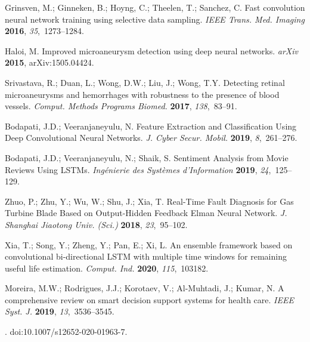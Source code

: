 \documentclass[electronics,article,accept ,moreauthors,pdftex]{mdpi}
\begin{document}
\begin{thebibliography}{999}
Grinsven, M.; Ginneken, B.; Hoyng, C.; Theelen, T.; Sanchez, C.
Fast convolution neural network training using selective data
 sampling.
{\em IEEE Trans. Med. Imaging} {\bf 2016}, {\em 35},~1273--1284.

Haloi, M.
Improved microaneurysm detection using deep neural networks.
{\em arXiv} {\bf 2015}, arXiv:1505.04424.

Srivastava, R.; Duan, L.; Wong, D.W.; Liu, J.; Wong, T.Y.
Detecting retinal microaneurysms and hemorrhages with robustness to
 the presence of blood vessels.
{\em Comput. Methods Programs Biomed.} {\bf 2017}, {\em
 138},~83--91.

Bodapati, J.D.; Veeranjaneyulu, N.
Feature Extraction and Classification Using Deep Convolutional Neural
 Networks.
{\em J. Cyber Secur. Mobil.} {\bf 2019}, {\em
 8},~261--276.

Bodapati, J.D.; Veeranjaneyulu, N.; Shaik, S.
Sentiment Analysis from Movie Reviews Using LSTMs.
{\em Ingénierie des Systèmes d'Information} {\bf 2019}, {\em 24},~125--129.

Zhuo, P.; Zhu, Y.; Wu, W.; Shu, J.; Xia, T.
Real-Time Fault Diagnosis for Gas Turbine Blade Based on
 Output-Hidden Feedback Elman Neural Network.
{\em J. Shanghai Jiaotong Univ. (Sci.)} {\bf 2018},
 {\em 23},~95--102.

Xia, T.; Song, Y.; Zheng, Y.; Pan, E.; Xi, L.
An ensemble framework based on convolutional bi-directional LSTM with
 multiple time windows for remaining useful life estimation.
{\em Comput. Ind.} {\bf 2020}, {\em 115},~103182.

Moreira, M.W.; Rodrigues, J.J.; Korotaev, V.; Al-Muhtadi, J.; Kumar, N.
A comprehensive review on smart decision support systems for health
 care.
{\em IEEE Syst. J.} {\bf 2019}, {\em 13},~3536--3545.

.
doi:10.1007/s12652-020-01963-7.


\end{thebibliography}
\end{document}
